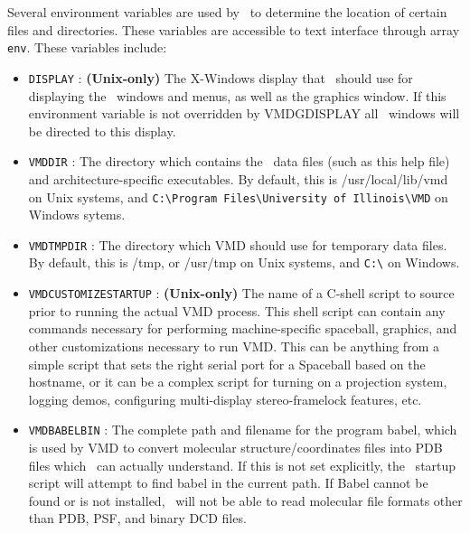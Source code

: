 Several environment variables are used by \VMD\ to determine the
location of certain files and directories. These variables are
accessible to text interface through array {\tt env}.
These variables include:

\begin{itemize}
  \item {\tt DISPLAY} :
   {\bf (Unix-only)}
   The X-Windows display that \VMD\ should use for displaying the
   \VMD\ windows and menus, as well as the graphics window.  If this
   environment variable is not overridden by VMDGDISPLAY all 
   \VMD\ windows will be directed to this display.
    

  \item {\tt VMDDIR} :
   The directory which contains the \VMD\ data files (such as this help
   file) and architecture-specific executables. By default, this is
   /usr/local/lib/vmd on Unix systems, and 
   \verb+C:\Program Files\University of Illinois\VMD+ on Windows sytems.

  \item {\tt VMDTMPDIR} :
   The directory which VMD should use for temporary data files. By
   default, this is /tmp, or /usr/tmp on Unix systems, and \verb+C:\+ 
   on Windows.

  \item {\tt VMDCUSTOMIZESTARTUP} :
   {\bf (Unix-only)}
   The name of a C-shell script to source prior to running the actual
   VMD process.  This shell script can contain any commands necessary for
   performing machine-specific spaceball, graphics, and other customizations
   necessary to run VMD.  This can be anything from a simple script that 
   sets the right serial port for a Spaceball based on the hostname, or 
   it can be a complex script for turning on a projection system, logging
   demos, configuring multi-display stereo-framelock features, etc.

  \item {\tt VMDBABELBIN} :
   The complete path and filename for the program babel, which is used
   by VMD to convert molecular structure/coordinates files into PDB
   files which \VMD\ can actually understand. If this is not set
   explicitly, the \VMD\ startup script will attempt to find babel in
   the current path. If Babel cannot be found or is not installed, \VMD\
   will not be able to read molecular file formats other than PDB,
   PSF, and binary DCD files.


\end{itemize}
